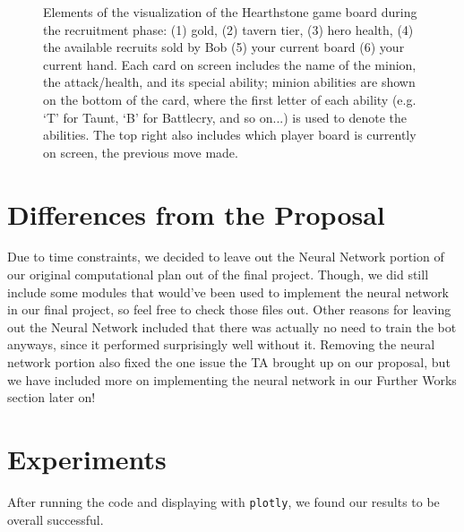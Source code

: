 \documentclass{paper}
\begin{document}
\begin{figure}[t]
    \caption{Elements of the visualization of the Hearthstone game board during the recruitment phase: (1) gold, (2) tavern tier, (3) hero health, (4) the available recruits sold by Bob (5) your current board (6) your current hand. Each card on screen includes the name of the minion, the attack/health, and its special ability; minion abilities are shown on the bottom of the card, where the first letter of each ability (e.g. `T' for Taunt, `B' for Battlecry, and so on...) is used to denote the abilities. The top right also includes which player board is currently on screen, the previous move made. }
    \label{fig:rudimentaryboard}
    
\end{figure}

\section{Differences from the Proposal}
Due to time constraints, we decided to leave out the Neural Network portion of our original computational plan out of the final project. Though, we did still include some modules that would've been used to implement the neural network in our final project, so feel free to check those files out. Other reasons for leaving out the Neural Network included that there was actually no need to train the bot anyways, since it performed surprisingly well without it. Removing the neural network portion also fixed the one issue the TA brought up on our proposal, but we have included more on implementing the neural network in our Further Works section later on!
\section{Experiments}


After running the code and displaying with \texttt{plotly}, we found our results to be overall successful. 
\end{document}
